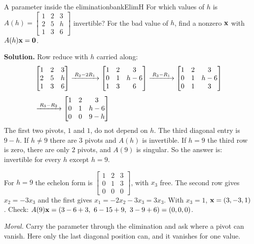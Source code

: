 \documentclass[11pt]{article}
\begin{document}
\begin{exmp}{A parameter inside the elimination}{bankElimH}
For which values of $h$ is $A(h)=\begin{bmatrix}1&2&3\\2&5&h\\1&3&6\end{bmatrix}$ invertible? For the bad value of $h$, find a nonzero $\mathbf{x}$ with $A(h)\mathbf{x}=\mathbf{0}$.

\textbf{Solution.} Row reduce with $h$ carried along:
\begin{align*}
&\begin{bmatrix}1&2&3\\2&5&h\\1&3&6\end{bmatrix}
\xrightarrow{\;R_2-2R_1\;}
\begin{bmatrix}1&2&3\\0&1&h-6\\1&3&6\end{bmatrix}
\xrightarrow{\;R_3-R_1\;}
\begin{bmatrix}1&2&3\\0&1&h-6\\0&1&3\end{bmatrix}\\[4pt]
&\xrightarrow{\;R_3-R_2\;}
\begin{bmatrix}1&2&3\\0&1&h-6\\0&0&9-h\end{bmatrix}
\end{align*}
The first two pivots, $1$ and $1$, do not depend on $h$. The third diagonal entry is $9-h$. If $h\neq9$ there are $3$ pivots and $A(h)$ is invertible. If $h=9$ the third row is zero, there are only $2$ pivots, and $A(9)$ is singular. So the answer is: invertible for every $h$ except $h=9$.

For $h=9$ the echelon form is $\begin{bmatrix}1&2&3\\0&1&3\\0&0&0\end{bmatrix}$, with $x_3$ free. The second row gives $x_2=-3x_3$ and the first gives $x_1=-2x_2-3x_3=3x_3$. With $x_3=1$, $\mathbf{x}=(3,-3,1)$. Check: $A(9)\bv{x}=(3-6+3,\ 6-15+9,\ 3-9+6)=(0,0,0)$.

\emph{Moral.} Carry the parameter through the elimination and ask where a pivot can vanish. Here only the last diagonal position can, and it vanishes for one value.
\end{exmp}
\end{document}
